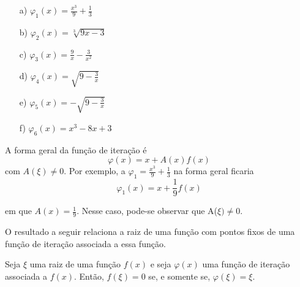 \begin{multicols}{2}
\begin{itemize} %
    \item[a)] $\varphi_1(x) = \frac{x^3}{9} + \frac{1}{3}$
    \item[b)] $\varphi_2(x) = \sqrt[3]{9x-3}$
    \item[c)] $\varphi_3(x) = \frac{9}{x} - \frac{3}{x^2}$
    \item[d)] $\varphi_4(x) = \sqrt{9 - \frac{3}{x}}$
    \item[e)] $\varphi_5(x) = -\sqrt{9 - \frac{3}{x}}$
    \item[f)] $\varphi_6(x) = x^3 - 8x + 3$
\end{itemize}
\end{multicols}
A forma geral da função de iteração é 
\begin{equation}
    \varphi(x) = x + A(x)f(x) \label{it}
\end{equation}
com $A(\xi) \ne 0$.
Por exemplo, a $\varphi_1 = \frac{x^3}{9} + \frac{1}{3}$ na forma geral ficaria 
\begin{equation*}
    \varphi_1(x) = x + \frac{1}{9}f(x)
\end{equation*}

em que $A(x) = \frac{1}{9}$. Nesse caso, pode-se observar que A($\xi) \neq 0$.

O resultado a seguir relaciona a raiz de uma função com pontos fixos de uma função de iteração associada a essa função. 

\begin{prop}
Seja $\xi$ uma raiz de uma função $f(x)$ e seja $\varphi(x)$ uma função de iteração associada a $f(x)$. Então, $f(\xi) = 0$ se, e somente se, $\varphi(\xi) = \xi$.
\end{prop}


